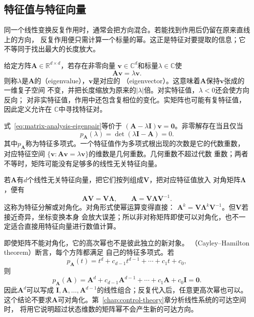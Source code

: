 \subsection{特征值与特征向量}

同一个线性变换反复作用时，通常会把方向混合。若能找到作用后仍留在原来直线上的方向，
反复作用便只需计算一个标量的幂。这正是特征对要提取的信息；它不等同于找出最大的长度放大。

给定方阵$\bm{A}\in\mathbb{R}^{d\times d}$，若存在非零向量
$\bm{v}\in\mathbb{C}^d$和标量$\lambda\in\mathbb{C}$使
\begin{equation}
  \bm{A}\bm{v}=\lambda\bm{v}.
  \label{eq:matrix-analysis-eigenpair}
\end{equation}
则称$\lambda$是$\bm{A}$的（eigenvalue），$\bm{v}$是对应的
（eigenvector）。这意味着$\bm{A}$保持$\bm{v}$张成的一维复子空间
不变，并把长度缩放为原来的$|\lambda|$倍。对实特征值，$\lambda<0$还会使方向反向；
对非实特征值，作用中还包含复相位的变化。实矩阵也可能有复特征值，因此定义允许在
$\mathbb{C}$中寻找特征对。

式~\eqref{eq:matrix-analysis-eigenpair}等价于
$(\bm{A}-\lambda\bm{I})\bm{v}=\bm{0}$。非零解存在当且仅当
\begin{equation}
  p_{\bm{A}}(\lambda)=\det(\lambda\bm{I}-\bm{A})=0.
  \label{eq:matrix-analysis-characteristic-polynomial}
\end{equation}
其中$p_{\bm{A}}$称为特征多项式。一个特征值作为多项式根出现的次数是它的代数重数，
对应特征空间
$\{\bm{v}:\bm{A}\bm{v}=\lambda\bm{v}\}$的维数是几何重数。几何重数不超过代数
重数；两者不等时，矩阵可能没有足够多的线性无关特征向量。

若$\bm{A}$有$d$个线性无关特征向量，把它们按列组成$\bm{V}$，把对应特征值放入
对角矩阵$\bm{\Lambda}$，便有
\[
  \bm{A}\bm{V}=\bm{V}\bm{\Lambda},
  \qquad \bm{A}=\bm{V}\bm{\Lambda}\bm{V}^{-1}.
\]
这称为特征分解或对角化。对角形式使幂运算变得直接：
$\bm{A}^k=\bm{V}\bm{\Lambda}^k\bm{V}^{-1}$。但$\bm{V}$若接近奇异，坐标变换本身
会放大误差；所以非对称矩阵即使可以对角化，也不一定适合直接用特征向量进行数值计算。

即使矩阵不能对角化，它的高次幂也不是彼此独立的新对象。
（Cayley--Hamilton theorem）断言，每个方阵都满足
自己的特征多项式。若
\[
  p_{\bm{A}}(t)=t^d+c_{d-1}t^{d-1}+\cdots+c_1t+c_0,
\]
则
\[
  p_{\bm{A}}(\bm{A})
  =\bm{A}^d+c_{d-1}\bm{A}^{d-1}+\cdots+c_1\bm{A}+c_0\bm{I}
  =\bm{0}.
\]
因此$\bm{A}^d$可以写成
$\bm{I},\bm{A},\ldots,\bm{A}^{d-1}$的线性组合；反复代入后，任意更高次幂也可以。
这个结论不要求$\bm{A}$可对角化。第~\ref{chap:control-theory}章分析线性系统的可达空间时，
将用它说明超过状态维数的矩阵幂不会产生新的可达方向。

